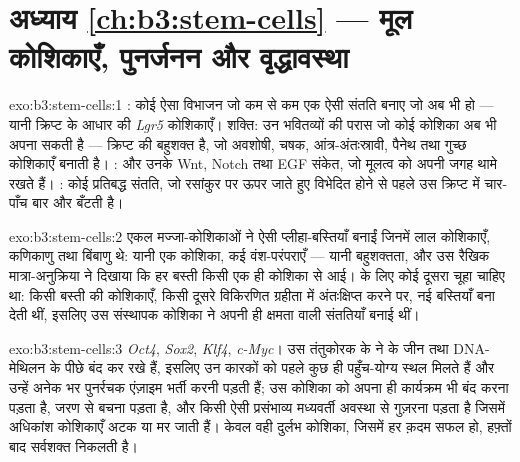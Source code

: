 \section*{अध्याय \ref{ch:b3:stem-cells} --- मूल कोशिकाएँ, पुनर्जनन और वृद्धावस्था}

\begin{solution}{exo:b3:stem-cells:1}
: कोई ऐसा विभाजन जो कम से कम एक ऐसी संतति बनाए जो अब भी  हो --- यानी क्रिप्ट के आधार की \emph{Lgr5} कोशिकाएँ। शक्ति: उन
भवितव्यों की परास जो कोई कोशिका अब भी अपना सकती है --- क्रिप्ट की  बहुशक्त है, जो अवशोषी, चषक, आंत्र-अंतःस्रावी, पैनेथ तथा गुच्छ
कोशिकाएँ बनाती है। :  और उनके Wnt, Notch तथा EGF
संकेत, जो मूलत्व को अपनी जगह थामे रखते हैं। :
कोई प्रतिबद्ध संतति, जो रसांकुर पर ऊपर जाते हुए विभेदित होने से पहले उस
क्रिप्ट में चार-पाँच बार और बँटती है।
\end{solution}

\begin{solution}{exo:b3:stem-cells:2}
एकल मज्जा-कोशिकाओं ने ऐसी प्लीहा-बस्तियाँ बनाईं जिनमें लाल कोशिकाएँ,
कणिकाणु तथा बिंबाणु थे: यानी एक कोशिका, कई वंश-परंपराएँ --- यानी
बहुशक्तता, और उस रैखिक मात्रा-अनुक्रिया ने दिखाया कि हर बस्ती किसी एक
ही कोशिका से आई।  के लिए कोई दूसरा चूहा चाहिए था: किसी बस्ती
की कोशिकाएँ, किसी दूसरे विकिरणित ग्रहीता में अंतःक्षिप्त करने पर, नई
बस्तियाँ बना देती थीं, इसलिए उस संस्थापक कोशिका ने अपनी ही क्षमता वाली
संततियाँ बनाई थीं।
\end{solution}

\begin{solution}{exo:b3:stem-cells:3}
\emph{Oct4}, \emph{Sox2}, \emph{Klf4}, \emph{c-Myc}। उस तंतुकोरक के
 ने  के जीन  तथा DNA-मेथिलन के पीछे बंद
कर रखे हैं, इसलिए उन कारकों को पहले कुछ ही पहुँच-योग्य स्थल मिलते हैं
और उन्हें अनेक  भर पुनर्रचक एंज़ाइम भर्ती करनी पड़ती हैं;
उस कोशिका को अपना ही कार्यक्रम भी बंद करना पड़ता है, जरण से बचना पड़ता
है, और किसी ऐसी प्रसंभाव्य मध्यवर्ती अवस्था से गुज़रना पड़ता है जिसमें
अधिकांश कोशिकाएँ अटक या मर जाती हैं। केवल वही दुर्लभ कोशिका, जिसमें हर
क़दम सफल हो, हफ़्तों बाद सर्वशक्त निकलती है।
\end{solution}

